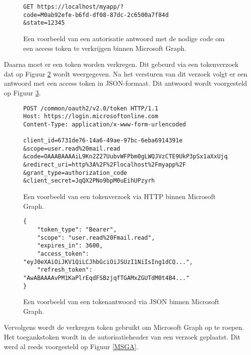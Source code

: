 \begin{figure}[h]
    \scriptsize
    \begin{verbatim}
GET https://localhost/myapp/?
code=M0ab92efe-b6fd-df08-87dc-2c6500a7f84d
&state=12345
    \end{verbatim}    
    \caption[Voorbeeld Microsoft Graph Authorization response]{Een voorbeeld van een autorisatie antwoord met de nodige code om een access token te verkrijgen binnen Microsoft Graph.}
    \label{MSGAR}
\end{figure}

Daarna moet er een token worden verkregen. Dit gebeurd via een tokenverzoek dat op Figuur \ref{HTR} wordt weergegeven. Na het versturen van dit verzoek volgt er een antwoord met een access token in \ac{JSON}-formaat. Dit antwoord wordt voorgesteld op Figuur \ref{HTRES}. \\ 

\begin{figure}[!h]
    \scriptsize
    \begin{verbatim}
POST /common/oauth2/v2.0/token HTTP/1.1
Host: https://login.microsoftonline.com
Content-Type: application/x-www-form-urlencoded
        
client_id=6731de76-14a6-49ae-97bc-6eba6914391e
&scope=user.read%20mail.read
&code=OAAABAAAAiL9Kn2Z27UubvWFPbm0gLWQJVzCTE9UkP3pSx1aXxUjq3n8b2JRLk4OxVXr...
&redirect_uri=http%3A%2F%2Flocalhost%2Fmyapp%2F
&grant_type=authorization_code
&client_secret=JqQX2PNo9bpM0uEihUPzyrh
    \end{verbatim}
    \caption[Voorbeeld User Token Request Microsoft Graph]{Een voorbeeld van een tokenverzoek via \ac{HTTP} binnen Microsoft Graph.}
    \label{HTR}
\end{figure}

\begin{figure}[!h]
    \scriptsize
    \begin{verbatim}
{
    "token_type": "Bearer",
    "scope": "user.read%20Fmail.read",
    "expires_in": 3600,
    "access_token": "eyJ0eXAiOiJKV1QiLCJhbGciOiJSUzI1NiIsIng1dCQ...",
    "refresh_token": "AwABAAAAvPM1KaPlrEqdFSBzjqfTGAMxZGUTdM0t4B4..."
}        
    \end{verbatim}    
    \caption[Voorbeeld User Token Response Microsoft Graph]{Een voorbeeld van een tokenantwoord via \ac{JSON} binnen Microsoft Graph.}
    \label{HTRES}
\end{figure}

Vervolgens wordt de verkregen token gebruikt om Microsoft Graph op te roepen. Het toegankstoken wordt in de autorisatieheader van een verzoek geplaatst. Dit werd al reeds voorgesteld op Figuur \ref{MSGA}. \\

